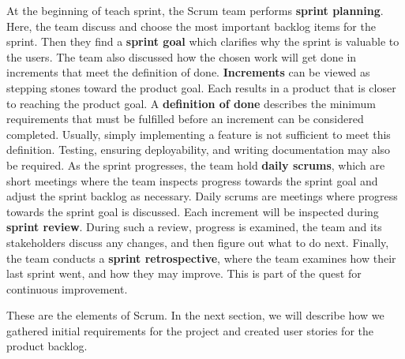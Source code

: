 At the beginning of teach sprint, the Scrum team performs \textbf{sprint planning}.
Here, the team discuss and choose the most important backlog items for the sprint.
Then they find a \textbf{sprint goal} which clarifies why the sprint is valuable to the users.
The team also discussed how the chosen work will get done in increments that meet the definition of done.
\textbf{Increments} can be viewed as stepping stones toward the product goal.
Each results in a product that is closer to reaching the product goal.
A \textbf{definition of done} describes the minimum requirements that must be fulfilled before an increment can be considered completed. 
Usually, simply implementing a feature is not sufficient to meet this definition. Testing, ensuring deployability, and writing documentation may also be required.
As the sprint progresses, the team hold \textbf{daily scrums}, which are short meetings where the team inspects progress towards the sprint goal and adjust the sprint backlog as necessary.
Daily scrums are meetings where progress towards the sprint goal is discussed.
Each increment will be inspected during \textbf{sprint review}.
During such a review, progress is examined, the team and its stakeholders discuss any changes, and then figure out what to do next.
Finally, the team conducts a \textbf{sprint retrospective}, where the team examines how their last sprint went, and how they may improve. This is part of the quest for continuous improvement.\cite{sutherlandScrumArtDoing2014}

These are the elements of Scrum. In the next section, we will describe how we gathered initial requirements for the project and created user stories for the product backlog.